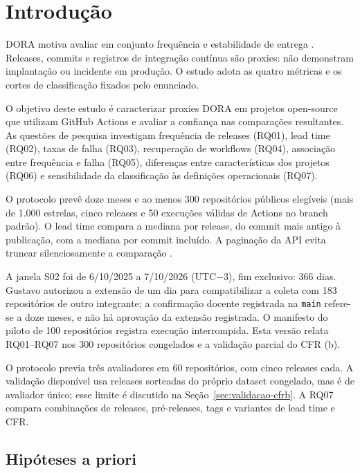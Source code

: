 \section{Introdução}
\label{sec:introducao}

DORA motiva avaliar em conjunto frequência e estabilidade de entrega
\cite{accelerate,dora}. Releases, commits e registros de integração contínua
são proxies: não demonstram implantação ou incidente em produção. O estudo
adota as quatro métricas e os cortes de classificação fixados pelo enunciado.

O objetivo deste estudo é caracterizar proxies DORA em projetos open-source
que utilizam GitHub Actions e avaliar a confiança nas comparações resultantes.
As questões de pesquisa investigam frequência de releases (RQ01), lead time
(RQ02), taxas de falha (RQ03), recuperação de workflows (RQ04), associação
entre frequência e falha (RQ05), diferenças entre características dos projetos
(RQ06) e sensibilidade da classificação às definições operacionais (RQ07).

O protocolo prevê doze meses e ao menos 300 repositórios públicos elegíveis
(mais de 1.000 estrelas, cinco releases e 50 execuções válidas de Actions no
branch padrão). O lead time compara a mediana por release, do commit mais
antigo à publicação, com a mediana por commit incluído. A paginação da API
evita truncar silenciosamente a comparação \cite{github}.

A janela S02 foi de 6/10/2025 a 7/10/2026 (UTC$-3$), fim exclusivo: 366 dias.
Gustavo autorizou a extensão de um dia para compatibilizar a coleta com 183
repositórios de outro integrante; a confirmação docente registrada na
\texttt{main} refere-se a doze meses, e não há aprovação da extensão
registrada. O manifesto do piloto de 100 repositórios registra execução
interrompida. Esta versão relata RQ01--RQ07 nos 300 repositórios congelados e
a validação parcial do CFR (b).

O protocolo previa três avaliadores em 60 repositórios, com cinco releases
cada. A validação disponível usa releases sorteadas do próprio dataset
congelado, mas é de avaliador único; esse limite é discutido na
Seção~\ref{sec:validacao-cfrb}. A RQ07
compara combinações de releases, pré-releases, tags e variantes de lead time e
CFR.

\subsection{Hipóteses a priori}

